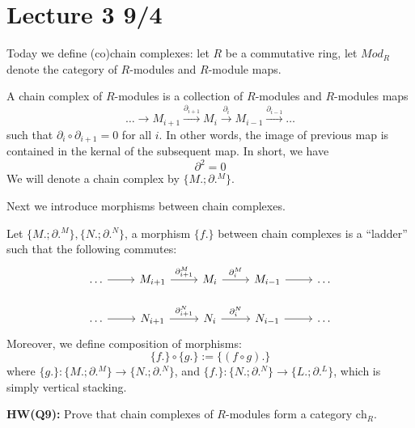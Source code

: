 \section{Lecture 3 9/4}
Today we define (co)chain complexes: let $R$ be a commutative ring, let $Mod_R$ denote the category of $R$-modules and $R$-module maps.
\begin{defn}
    A chain complex of $R$-modules is a collection of $R$-modules and $R$-modules maps 
    \begin{equation*}
        \dots\to M_{i+1}\xrightarrow{\partial_{i+1}}M_i\xrightarrow{\partial_i}M_{i-1}\xrightarrow{\partial_{i-1}}\dots
    \end{equation*}
    such that $\partial_i\circ\partial_{i+1}=0$ for all $i$. In other words, the image of previous map is contained in the kernal of the subsequent map. In short, we have 
    \begin{equation*}
        \partial^2=0
    \end{equation*}
    We will denote a chain complex by $\{M.; \partial.^M\}$.
\end{defn}
Next we introduce morphisms between chain complexes.
\begin{defn}
    Let $\{M.;\partial.^M\}, \{N.;\partial.^N\}$, a morphism $\{f.\}$ between chain complexes is a ``ladder'' such that the following commutes:
    \[\begin{tikzcd}
        \dots & {M_{i+1}} & {M_i} & {M_{i-1}} & \dots \\
        \dots & {N_{i+1}} & {N_i} & {N_{i-1}} & \dots
        \arrow[from=1-1, to=1-2]
        \arrow["{\partial_{i+1}^M}", from=1-2, to=1-3]
        \arrow["{\partial_i^M}", from=1-3, to=1-4]
        \arrow[from=1-4, to=1-5]
        \arrow[from=2-1, to=2-2]
        \arrow["{\partial_{i+1}^N}", from=2-2, to=2-3]
        \arrow["{\partial_{i}^N}", from=2-3, to=2-4]
        \arrow[from=2-4, to=2-5]
    \end{tikzcd}\]
    Moreover, we define composition of morphisms:
    \begin{equation*}
        \{f.\}\circ \{g.\}:=\{(f\circ g).\}
    \end{equation*}
    where $\{g.\}:\{M.;\partial.^M\}\to\{N.;\partial.^N\}$, and $\{f.\}:\{N.;\partial.^N\}\to \{L.;\partial.^L\}$, which is simply vertical stacking.
\end{defn}
\begin{prob}
    \textbf{HW(Q9):} Prove that chain complexes of $R$-modules form a category $\text{ch}_R$.
\end{prob}
